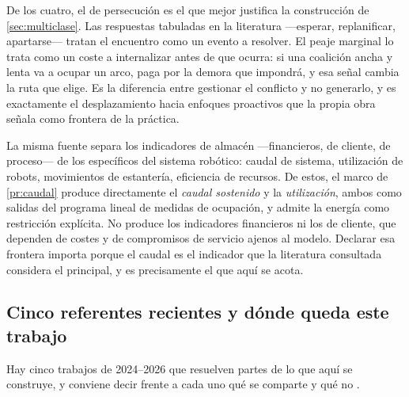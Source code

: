 \begin{observacion}
\label{obs:persecucion}
De los cuatro, el de persecución es el que mejor justifica la construcción de
\cref{sec:multiclase}. Las respuestas tabuladas en la literatura —esperar,
replanificar, apartarse— tratan el encuentro como un evento a resolver. El peaje
marginal lo trata como un coste a internalizar antes de que ocurra: si una
coalición ancha y lenta va a ocupar un arco, paga por la demora que impondrá, y
esa señal cambia la ruta que elige. Es la diferencia entre gestionar el conflicto
y no generarlo, y es exactamente el desplazamiento hacia enfoques proactivos que
la propia obra señala como frontera de la práctica.
\end{observacion}

\begin{observacion}
\label{obs:kpis}
La misma fuente separa los indicadores de almacén —financieros, de cliente, de
proceso— de los específicos del sistema robótico: caudal de sistema, utilización
de robots, movimientos de estantería, eficiencia de recursos. De estos, el marco
de \cref{pr:caudal} produce directamente el \emph{caudal sostenido} y la
\emph{utilización}, ambos como salidas del programa lineal de medidas de
ocupación, y admite la energía como restricción explícita. No produce los
indicadores financieros ni los de cliente, que dependen de costes y de
compromisos de servicio ajenos al modelo. Declarar esa frontera importa porque
el caudal es el indicador que la literatura consultada considera el principal, y
es precisamente el que aquí se acota.
\end{observacion}

\subsection{Cinco referentes recientes y dónde queda este trabajo}

Hay cinco trabajos de 2024--2026 que resuelven partes de lo que aquí se
construye, y conviene decir frente a cada uno qué se comparte y qué no
\cite{mayorga2026compendio}.

